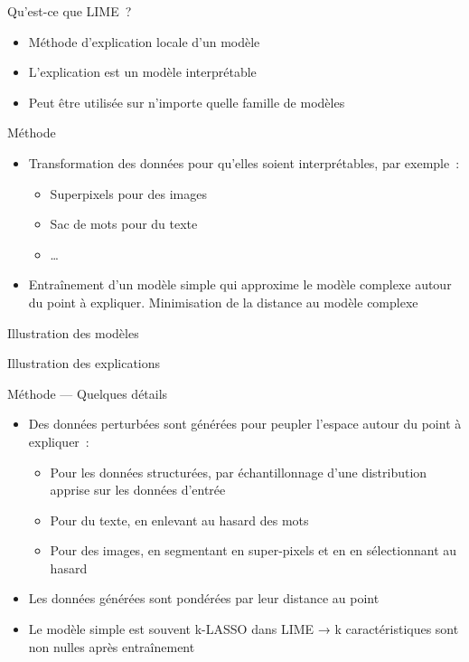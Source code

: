 \begin{frame}{Qu'est-ce que LIME~?}
  \begin{itemize}
    \item Méthode d'explication locale d'un modèle
    \item L'explication est un modèle interprétable
    \item Peut être utilisée sur n'importe quelle famille de modèles
  \end{itemize}
\end{frame}

\begin{frame}{Méthode}
  \begin{itemize}
    \item Transformation des données pour qu'elles soient interprétables, par exemple~:
      \begin{itemize}
        \item Superpixels pour des images
        \item Sac de mots pour du texte
        \item …
      \end{itemize}
    \item Entraînement d'un modèle simple qui approxime le modèle complexe autour du point à expliquer. Minimisation de la distance au modèle complexe
  \end{itemize}
\end{frame}

\begin{frame}{Illustration des modèles}
\end{frame}

\begin{frame}{Illustration des explications}
\end{frame}

\begin{frame}{Méthode — Quelques détails}
  \begin{itemize}
    \item Des données perturbées sont générées pour peupler l'espace autour du point à expliquer~:
      \begin{itemize}
        \item Pour les données structurées, par échantillonnage d'une distribution apprise sur les données d'entrée
        \item Pour du texte, en enlevant au hasard des mots
        \item Pour des images, en segmentant en super-pixels et en en sélectionnant au hasard
      \end{itemize}
    \item Les données générées sont pondérées par leur distance au point
    \item Le modèle simple est souvent k-LASSO dans LIME → k caractéristiques sont non nulles après entraînement
  \end{itemize}
\end{frame}

